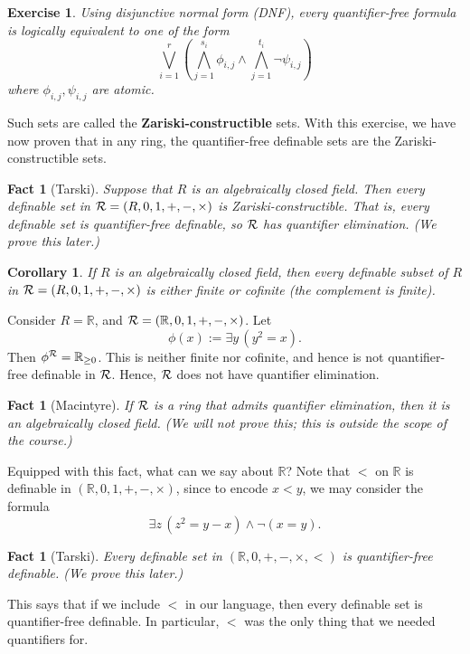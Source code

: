 \documentclass[10pt]{article}
\newcommand{\R}{\mathbb{R}}
\theoremstyle{newstyle}
\newtheorem{fact}[thm]{Fact}
\newtheorem{cor}[thm]{Corollary}
\newtheorem{exercise}[thm]{Exercise}
\begin{document}
\begin{exercise}
Using disjunctive normal form (DNF), every quantifier-free formula is logically equivalent 
to one of the form 
\[ \bigvee_{i=1}^r \left( \bigwedge_{j=1}^{s_i} \phi_{i,j} \wedge \bigwedge_{j=1}^{t_i} 
\neg \psi_{i,j} \right) \]
where $\phi_{i,j}, \psi_{i,j}$ are atomic.
\end{exercise}

Such sets are called the {\bf Zariski-constructible} sets. With this exercise, we have now proven that in
any ring, the quantifier-free definable sets are the Zariski-constructible sets. 

\begin{fact}[Tarski]
Suppose that $R$ is an algebraically closed field. Then every definable set in ${\cal R} 
= (R, 0, 1, +, -, \times)$ is Zariski-constructible. That is, every definable set is 
quantifier-free definable, so ${\cal R}$ has quantifier elimination. 
(We prove this later.)
\end{fact}

\begin{cor}
If $R$ is an algebraically closed field, then every definable subset of $R$ in 
${\cal R} = (R, 0, 1, +, -, \times)$ is either finite or cofinite (the complement is finite).
\end{cor}

Consider $R = \R$, and ${\cal R} = (\R, 0, 1, +, -, \times)$. Let 
\[ \phi(x) := \exists y \, (y^2 = x). \] 
Then $\phi^{\cal R} = \R_{\geq0}$. This is neither finite nor cofinite, and hence is not 
quantifier-free definable in ${\cal R}$. Hence, ${\cal R}$ does not have quantifier elimination.

\begin{fact}[Macintyre]
If ${\cal R}$ is a ring that admits quantifier elimination, then it is an algebraically closed field. 
(We will not prove this; this is outside the scope of the course.)
\end{fact}

Equipped with this fact, what can we say about $\R$? Note that $<$ on $\R$ is definable in 
$(\R, 0, 1, +, -, \times)$, since to encode $x < y$, we may consider the formula 
\[ \exists z \, (z^2 = y - x) \wedge \neg (x = y). \] 

\begin{fact}[Tarski]
Every definable set in $(\R, 0, +, -, \times, <)$ is quantifier-free definable. 
(We prove this later.)
\end{fact}

This says that if we include $<$ in our language, then every definable set 
is quantifier-free definable. In particular, $<$ was the only thing that 
we needed quantifiers for. 
\end{document}
